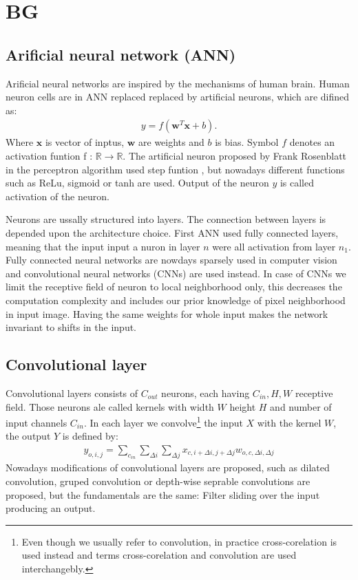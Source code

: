 \chapter{BG}
\section{Arificial neural network (ANN)}
Arificial neural networks are inspired by the mechanisms of human brain. Human neuron cells are in ANN replaced replaced by artificial neurons, which are difined as:
\begin{align}
    y = f \left( \boldsymbol{w}^T \boldsymbol{x}  + b \right).
\end{align}
Where $\boldsymbol{x}$ is vector of inptus, $\boldsymbol{w}$ are weights and $b$ is bias. Symbol $f$ denotes an activation funtion f : $\mathbb{R} \rightarrow \mathbb{R}$. The artificial neuron proposed by Frank Rosenblatt in the perceptron algorithm used step funtion \cite{Rosenblatt1958}, but nowadays different functions such as ReLu, sigmoid or tanh are used. Output of the neuron $y$ is called activation of the neuron.

Neurons are ussally structured into layers. The connection between layers is depended upon the architecture choice. First ANN used fully connected layers, meaning that the input input a nuron in layer $n$ were all activation from layer $n_1$. Fully connected neural networks are nowdays sparsely used in computer vision and convolutional neural networks (CNNs) are used instead. In case of CNNs we limit the receptive field of neuron to local neighborhood only, this decreases the computation complexity and includes our prior knowledge of pixel neighborhood in input image. Having the same weights for whole input makes the network invariant to shifts in the input.

\section{Convolutional layer}
Convolutional layers consists of $C_{out}$ neurons, each having $C_{in}, H, W$ receptive field. Those neurons ale called kernels with width $W$ height $H$ and number of input channels $C_{in}$. In each layer we convolve\footnote{Even though we usually refer to convolution, in practice cross-corelation is used instead and terms cross-corelation and convolution are used interchangebly.} the input $X$  with the kernel $W$, the output $Y$ is defined by:
\begin{align}
    y_{o,i,j} = \sum_{c_{in}} \sum_{\Delta i} \sum_{\Delta j} x_{c, i+\Delta i, j + \Delta j}  w_{o,c, \Delta i, \Delta j}
\end{align}
Nowadays modifications of convolutional layers are proposed, such as dilated convolution, gruped convolution or depth-wise seprable convolutions are proposed, but the fundamentals are the same: Filter sliding over the input producing an output.


